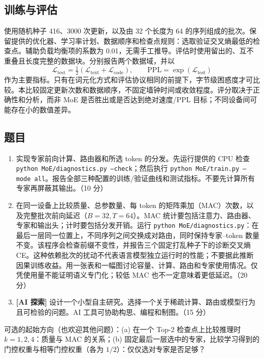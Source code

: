 \documentclass[UTF8,11pt,oneside]{ctexart}
\newcommand{\Lcal}{\mathcal{L}}
\begin{document}
\FloatBarrier
\subsection{训练与评估}
使用随机种子 416、3000 次更新，以及由 32 个长度为 64 的序列组成的批次。保留提供的优化器、学习率计划、数据顺序和检查点规则：选取验证交叉熵最低的检查点。辅助负载均衡项的系数为 0.01，无需手工推导。评估时使用留出的、互不重叠且长度完整的数据块。分别报告两个数据域，并以
\begin{equation}
\Lcal_{\mathrm{test}}=\tfrac12(\Lcal_{\mathrm{text}}+\Lcal_{\mathrm{code}}),\qquad \mathrm{PPL}=\exp(\Lcal_{\mathrm{test}})\tag{8}
\end{equation}
作为主要指标。只有在词元化方式和评估协议相同的前提下，字节级困惑度才可比较。本比较固定更新次数和数据顺序，不固定墙钟时间或收敛程度。评分取决于正确性和分析，而非 MoE 是否胜出或是否达到绝对速度/PPL 目标；不同设备间可能存在小的数值差异。

\subsection{题目}
\begin{enumerate}
\item 实现专家前向计算、路由器和所选 token 的分发。先运行提供的 CPU 检查 \texttt{python}\allowbreak\ \texttt{MoE/diagnostics.py}\allowbreak\ \texttt{--check}；然后执行 \texttt{python}\allowbreak\ \texttt{MoE/train.py}\allowbreak\ \texttt{--mode all}。报告全部三种配置的训练/验证曲线和测试指标。不要先计算所有专家再屏蔽其输出。（10 分）
\item 在同一设备上比较质量、总参数量、每 token 的矩阵乘加（MAC）次数，以及完整批次前向延迟（$B=32,T=64$）。MAC 统计要包括注意力、路由器、专家和输出头；计时要包括分发开销。运行 \texttt{python MoE/diagnostics.py}：在最后一层同一位置上，不同序列之间交换成对路由，同时保持专家--token 数量不变。该程序会检查前缀不变性，并报告三个固定打乱种子下的诊断交叉熵 CE。这种依赖批次的扰动不代表语言模型独立运行时的性能；不要据此推断因果训练收益。用一张表和一幅图讨论容量、计算、路由和专家使用情况。仅凭使用量不能证明语义专门化；较低 MAC 也不一定意味着更低延迟。（20 分）
\item \textbf{[AI 探索]} 设计一个小型自主研究。选择一个关于稀疏计算、路由或模型行为且可检验的问题。AI 工具可协助构思、编程和制图。（15 分）
\end{enumerate}
可选的起始方向（也欢迎其他问题）：(a) 在一个 Top-2 检查点上比较推理时 $k=1,2,4$：质量与 MAC 的关系；(b) 固定最后一层选中的专家，比较学习得到的门控权重与相等门控权重（各为 $1/2$）：仅仅选对专家是否足够？
\end{document}
